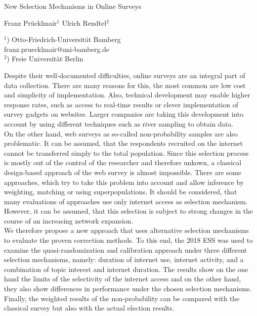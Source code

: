 \documentclass[a4paper]{article}
\begin{document}

\Large
 \begin{center}
New Selection Mechanisms in Online Surveys\\ 

\hspace{10pt}

\large
Franz Prücklmair$^1$ Ulrich Rendtel$^2$ \\

\hspace{10pt}

\small  
$^1$) Otto-Friedrich-Universität Bamberg\\
franz.pruecklmair@uni-bamberg.de\\
$^2$) Freie Universität Berlin

\end{center}

\hspace{10pt}

\normalsize

Despite their well-documented difficulties, online surveys are an integral part of data collection. There are many reasons for this, the most common are low cost and simplicity of implementation. Also, technical development may enable higher response rates, such as access to real-time results or clever implementation of survey gadgets on websites. Larger companies are taking this development into account by using different techniques such as river sampling to obtain data.
\\

On the other hand, web surveys as so-called non-probability samples are also problematic. It can be assumed, that the respondents recruited on the internet cannot be transferred simply to the total population. Since this selection process is mostly out of the control of the researcher and therefore unkown, a classical design-based approach of the web survey is almost impossible. There are some approaches, which try to take this problem into account and allow inference by weighting, matching or using superpopulations. It should be considered, that many evaluations of approaches use only internet access as selection mechanism. However, it can be assumed, that this selection is subject to strong changes in the course of an increasing network expansion. 
\\

We therefore propose a new approach that uses alternative selection mechanisms to evaluate the proven correction methods. To this end, the 2018 ESS was used to examine the quasi-randomization and calibration approach under three different selection mechanisms, namely: duration of internet use, internet activity, and a combination of topic interest and internet duration. The results show on the one hand the limits of the selectivity of the internet access and on the other hand, they also show differences in performance under the chosen selection mechanisms.  Finally, the weighted results of the non-probability can be compared with the classical survey but also with the actual election results.
\end{document}
